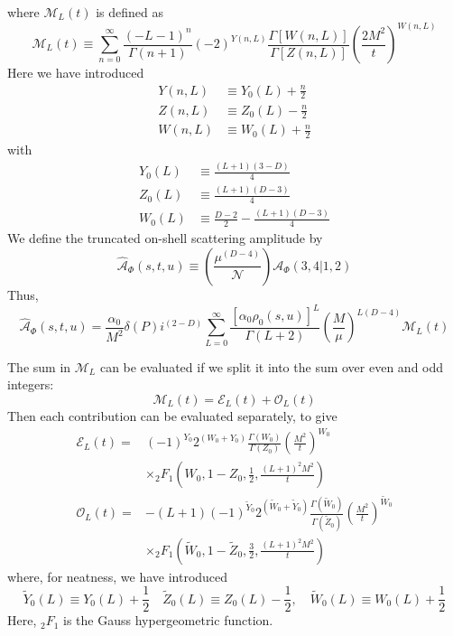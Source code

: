 where $\mathcal{M}_{L}(t)$ is defined as
\begin{equation}
	\mathcal{M}_{L}(t) \equiv \sum_{n = 0}^{\infty} \frac{(-L-1)^{n}}{\Gamma(n + 1)} (-2)^{Y(n, L)} \frac{\Gamma[W(n, L)]}{\Gamma[Z(n, L)]} \left( \frac{2M^{2}}{t} \right)^{W(n, L)}
\end{equation}
Here we have introduced
\begin{align}
	Y(n, L) &\equiv Y_{0}(L) + \frac{n}{2} \\
	Z(n, L) &\equiv Z_{0}(L) - \frac{n}{2} \\
	W(n, L) &\equiv W_{0}(L) + \frac{n}{2}
\end{align}
with
\begin{align}
	Y_{0}(L) &\equiv \frac{(L + 1)(3 - D)}{4} \\
	Z_{0}(L) &\equiv \frac{(L + 1)(D - 3)}{4} \\
	W_{0}(L) &\equiv \frac{D - 2}{2} - \frac{(L + 1)(D - 3)}{4}
\end{align}
We define the truncated on-shell scattering amplitude by
\begin{equation}
	\widehat{\mathcal{A}}_{\Phi}(s, t, u) \equiv \left( \frac{\mu^{(D - 4)}}{\mathcal{N}} \right) \mathcal{A}_{\Phi}(3, 4|1,2)
\end{equation}
Thus,
\begin{equation}
	\widehat{\mathcal{A}}_{\Phi}(s, t, u) = \frac{\alpha_{0}}{M^{2}} \delta(P) i^{(2 - D)} \sum_{L = 0}^{\infty} \frac{[\alpha_{0} \rho_{0}(s, u)]^{L}}{\Gamma(L+2)} \left( \frac{M}{\mu} \right)^{L(D - 4)} \mathcal{M}_{L}(t) \label{AHatPhiM}
\end{equation}

The sum in $\mathcal{M}_{L}$ can be evaluated if we split it into the sum over even and odd integers:
\begin{equation}
	\mathcal{M}_{L}(t) = \mathcal{E}_{L}(t) + \mathcal{O}_{L}(t)
\end{equation}
Then each contribution can be evaluated separately, to give
\begin{align}
	\mathcal{E}_{L}(t) = {}& (-1)^{Y_{0}} 2^{(W_{0} + Y_{0})} \frac{\Gamma(W_{0})}{\Gamma(Z_{0})} \left( \frac{M^{2}}{t} \right)^{W_{0}} \nonumber \\
	&\times {}_{2} F_{1} \left(W_{0}, 1 - Z_{0}, \frac{1}{2}, \frac{(L+1)^{2} M^{2}}{t} \right) \\
	\mathcal{O}_{L}(t) = {}& -(L+1) (-1)^{\tilde{Y}_{0}} 2^{(\tilde{W}_{0} + \tilde{Y}_{0})} \frac{\Gamma(\tilde{W}_{0})}{\Gamma(\tilde{Z}_{0})} \left( \frac{M^{2}}{t} \right)^{\tilde{W}_{0}} \nonumber \\
	&\times {}_{2} F_{1} \left(\tilde{W}_{0}, 1 - \tilde{Z}_{0}, \frac{3}{2}, \frac{(L+1)^{2} M^{2}}{t} \right)
\end{align}
where, for neatness, we have introduced
\begin{equation}
	\tilde{Y}_{0}(L) \equiv Y_{0}(L) + \frac{1}{2} \quad \tilde{Z}_{0}(L) \equiv Z_{0}(L) - \frac{1}{2}, \quad \tilde{W}_{0}(L) \equiv W_{0}(L) + \frac{1}{2}
\end{equation}
Here, ${}_{2} F_{1}$ is the Gauss hypergeometric function.

